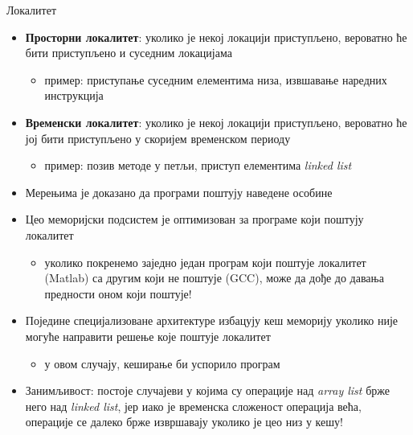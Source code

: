 \documentclass[xcolor=table]{beamer}
\begin{document}
    \begin{frame}[allowframebreaks]{Локалитет}
        \begin{itemize}
            \item \textbf{Просторни локалитет}: уколико је некој локацији приступљено, вероватно ће бити приступљено и суседним локацијама
            \begin{itemize}
                \item пример: приступање суседним елементима низа, извшавање наредних инструкција
            \end{itemize}
            \item \textbf{Временски локалитет}: уколико је некој локацији приступљено, вероватно ће јој бити приступљено у скоријем временском периоду
            \begin{itemize}
                \item пример: позив методе у петљи, приступ елементима \textit{linked list}
            \end{itemize}
            \item Мерењима је доказано да програми поштују наведене особине
        \end{itemize}
        
        \framebreak

        \begin{itemize} 
            \item Цео меморијски подсистем је оптимизован за програме који поштују локалитет
            \begin{itemize}
                \item уколико покренемо заједно један програм који поштује локалитет (Matlab) са другим који не поштује (GCC), може да дође до давања предности оном који поштује! 
            \end{itemize}
            \item Поједине специјализоване архитектуре избацују кеш меморију уколико није могуће направити решење које поштује локалитет
            \begin{itemize}
                \item у овом случају, кеширање би успорило програм
            \end{itemize}
            \item Занимљивост: постоје случајеви у којима су операције над \textit{array list} брже него над \textit{linked list}, јер иако је временска сложеност операција већа, операције се далеко брже извршавају уколико је цео низ у кешу!
        \end{itemize}
    \end{frame}
    
\end{document}
